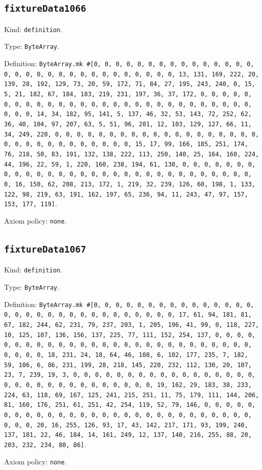 \documentclass[11pt]{article}
\begin{document}
\subsection*{\texttt{fixtureData1066}}
\noindent Kind: \texttt{definition}.\par
\noindent Type: \texttt{ByteArray}.\par
\noindent Definition: \texttt{ByteArray.mk \#[0, 0, 0, 0, 0, 0, 0, 0, 0, 0, 0, 0, 0, 0, 0, 0, 0, 0, 0, 0, 0, 0, 0, 0, 0, 0, 0, 0, 0, 0, 0, 13, 131, 169, 222, 20, 139, 28, 192, 129, 73, 20, 59, 172, 71, 84, 27, 195, 243, 240, 0, 15, 5, 21, 182, 67, 184, 183, 219, 231, 197, 36, 37, 172, 0, 0, 0, 0, 0, 0, 0, 0, 0, 0, 0, 0, 0, 0, 0, 0, 0, 0, 0, 0, 0, 0, 0, 0, 0, 0, 0, 0, 0, 0, 0, 14, 34, 182, 95, 141, 5, 137, 46, 32, 53, 143, 72, 252, 62, 36, 40, 104, 97, 207, 63, 5, 51, 96, 201, 12, 103, 129, 127, 66, 11, 34, 249, 220, 0, 0, 0, 0, 0, 0, 0, 0, 0, 0, 0, 0, 0, 0, 0, 0, 0, 0, 0, 0, 0, 0, 0, 0, 0, 0, 0, 0, 0, 0, 0, 15, 17, 99, 166, 185, 251, 174, 76, 218, 50, 83, 191, 132, 138, 222, 113, 250, 140, 25, 164, 160, 224, 44, 196, 22, 59, 1, 220, 160, 238, 194, 61, 130, 0, 0, 0, 0, 0, 0, 0, 0, 0, 0, 0, 0, 0, 0, 0, 0, 0, 0, 0, 0, 0, 0, 0, 0, 0, 0, 0, 0, 0, 0, 0, 16, 150, 62, 208, 213, 172, 1, 219, 32, 239, 126, 60, 198, 1, 133, 122, 98, 219, 63, 191, 162, 197, 65, 236, 94, 11, 243, 47, 97, 157, 153, 177, 119]}.\par
\noindent Axiom policy: \texttt{none}.\par
\subsection*{\texttt{fixtureData1067}}
\noindent Kind: \texttt{definition}.\par
\noindent Type: \texttt{ByteArray}.\par
\noindent Definition: \texttt{ByteArray.mk \#[0, 0, 0, 0, 0, 0, 0, 0, 0, 0, 0, 0, 0, 0, 0, 0, 0, 0, 0, 0, 0, 0, 0, 0, 0, 0, 0, 0, 0, 0, 0, 17, 61, 94, 181, 81, 67, 182, 244, 62, 231, 79, 237, 203, 1, 205, 196, 41, 99, 0, 118, 227, 10, 125, 107, 136, 156, 137, 225, 77, 111, 152, 254, 137, 0, 0, 0, 0, 0, 0, 0, 0, 0, 0, 0, 0, 0, 0, 0, 0, 0, 0, 0, 0, 0, 0, 0, 0, 0, 0, 0, 0, 0, 0, 0, 18, 231, 24, 18, 64, 46, 108, 6, 102, 177, 235, 7, 182, 59, 106, 6, 86, 231, 199, 28, 218, 145, 220, 232, 112, 130, 20, 107, 23, 7, 239, 19, 3, 0, 0, 0, 0, 0, 0, 0, 0, 0, 0, 0, 0, 0, 0, 0, 0, 0, 0, 0, 0, 0, 0, 0, 0, 0, 0, 0, 0, 0, 0, 0, 19, 162, 29, 183, 38, 233, 224, 63, 118, 69, 167, 125, 241, 215, 251, 11, 75, 179, 111, 144, 206, 81, 160, 176, 251, 61, 251, 42, 254, 119, 52, 79, 146, 0, 0, 0, 0, 0, 0, 0, 0, 0, 0, 0, 0, 0, 0, 0, 0, 0, 0, 0, 0, 0, 0, 0, 0, 0, 0, 0, 0, 0, 0, 0, 20, 16, 255, 126, 93, 17, 43, 142, 217, 171, 93, 199, 240, 137, 181, 22, 46, 184, 14, 161, 249, 12, 137, 140, 216, 255, 88, 20, 203, 232, 234, 80, 86]}.\par
\noindent Axiom policy: \texttt{none}.\par
\end{document}
